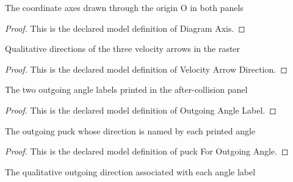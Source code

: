\begin{definition}
  \label{def:physics:phyx-mini-0816:phyxminiproblems-problemphyxmini0816-diagramaxis}
  The coordinate axes drawn through the origin O in both panels
\end{definition}
\begin{proof}
  This is the declared model definition of Diagram Axis.
\end{proof}
\begin{definition}
  \label{def:physics:phyx-mini-0816:phyxminiproblems-problemphyxmini0816-velocityarrowdirection}
  Qualitative directions of the three velocity arrows in the raster
\end{definition}
\begin{proof}
  This is the declared model definition of Velocity Arrow Direction.
\end{proof}
\begin{definition}
  \label{def:physics:phyx-mini-0816:phyxminiproblems-problemphyxmini0816-outgoinganglelabel}
  The two outgoing angle labels printed in the after-collision panel
\end{definition}
\begin{proof}
  This is the declared model definition of Outgoing Angle Label.
\end{proof}
\begin{definition}
  \label{def:physics:phyx-mini-0816:phyxminiproblems-problemphyxmini0816-puckforoutgoingangle}
  The outgoing puck whose direction is named by each printed angle
\end{definition}
\begin{proof}
  This is the declared model definition of puck For Outgoing Angle.
\end{proof}
\begin{definition}
  \label{def:physics:phyx-mini-0816:phyxminiproblems-problemphyxmini0816-directionforoutgoingangle}
  The qualitative outgoing direction associated with each angle label
\end{definition}
